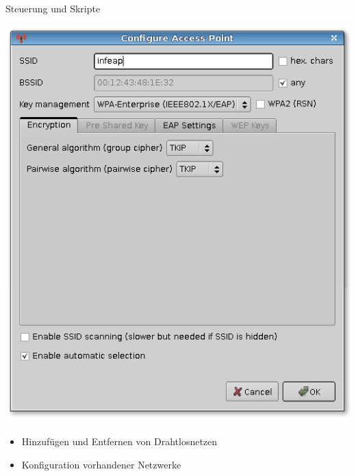 \begin{frame}[<+-| alert@+>]{Steuerung und Skripte}

		\includegraphics[scale=0.25]{qnut_netconfig.png}

	\begin{itemize}
		\item Hinzufügen und Entfernen von Drahtlosnetzen
		\item Konfiguration vorhandener Netzwerke
	\end{itemize}
\end{frame}


